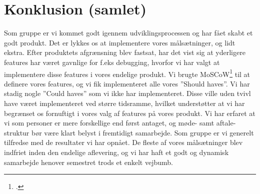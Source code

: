 \chapter{Konklusion (samlet)}

Som gruppe er vi kommet godt igennem udviklingsprocessen og har fået skabt et godt produkt. Det er lykkes os at implementere vores målsætninger, og lidt ekstra. Efter produktets afgrænsning blev fastsat, har det vist sig at yderligere features har været gavnlige for f.eks debugging, hvorfor vi har valgt at implementere disse features i vores endelige produkt. 
Vi brugte MoSCoW\footcite{moscow} til at definere vores features, og vi fik implementeret alle vores ”Should haves”. Vi har stadig nogle ”Could haves” som vi ikke har implementeret. Disse ville uden tvivl have været implementeret ved større tidsramme, hvilket understøtter at vi har begrænset os fornuftigt i vores valg af features på vores produkt. 
Vi har erfaret at vi som personer er mere forskellige end først antaget, og møde- samt aftale-struktur bør være klart belyst i fremtidigt samarbejde. 
Som gruppe er vi generelt tilfredse med de resultater vi har opnået. De fleste af vores målsætninger blev indfriet inden den endelige aflevering, og vi har haft et godt og dynamisk samarbejde henover semestret trods et enkelt vejbumb.
